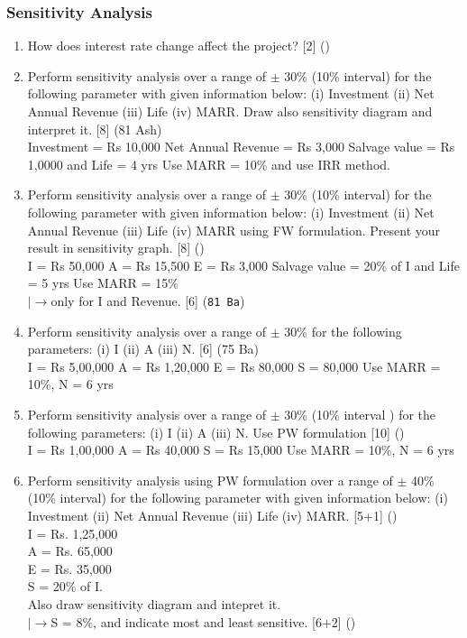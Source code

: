 \documentclass[12pt]{article}
\newcommand{\lb}{\\ $\left|\rightarrow\right.$}
\begin{document}
	\subsubsection{Sensitivity Analysis}
		\begin{enumerate}
			\item How does interest rate change affect the project? \hfill [2] ()


			\item Perform sensitivity analysis over a range of $\pm$ 30\% (10\% interval) for the following parameter with given information below: (i) Investment (ii) Net Annual Revenue (iii) Life (iv) MARR. Draw also sensitivity diagram and interpret it. \hfill [8] (81 Ash)\\
			Investment = Rs 10,000
			Net Annual Revenue = Rs 3,000
			Salvage value = Rs 1,0000 and Life = 4 yrs
			Use MARR = 10\% and use IRR method.

			\item Perform sensitivity analysis over a range of $\pm$ 30\% (10\% interval) for the following parameter with given information below: (i) Investment (ii) Net Annual Revenue (iii) Life (iv) MARR using FW formulation. Present your result in sensitivity graph. \hfill [8] ()\\
			I = Rs 50,000
			A = Rs 15,500
			E = Rs 3,000
			Salvage value = 20\% of I and Life = 5 yrs
			Use MARR = 15\%
			\lb only for I and Revenue. \hfill [6] (\texttt{81 Ba})

			\item Perform sensitivity analysis over a range of $\pm$ 30\% for the following parameters: (i) I (ii) A (iii) N. \hfill [6] (75 Ba)\\
			I = Rs 5,00,000
			A = Rs 1,20,000
			E = Rs 80,000
			S = 80,000
			Use MARR = 10\%, N = 6 yrs

			\item Perform sensitivity analysis over a range of $\pm$ 30\% (10\% interval ) for the following parameters: (i) I (ii) A (iii) N. Use PW formulation \hfill [10] ()\\
			I = Rs 1,00,000
			A = Rs 40,000
			S = Rs 15,000
			Use MARR = 10\%, N = 6 yrs

			\item Perform sensitivity analysis using PW formulation over a range of $\pm$ 40\% (10\% interval) for the following parameter with given information below: (i) Investment (ii) Net Annual Revenue (iii) Life (iv) MARR. \hfill [5+1] ()\\
			I = Rs. 1,25,000\\
			A = Rs. 65,000\\
			E = Rs. 35,000\\
			S = 20\% of I.\\
			Also draw sensitivity diagram and intepret it.
			\lb S = 8\%, and indicate most and least sensitive. \hfill [6+2] ()
			

\end{enumerate}
\end{document}
